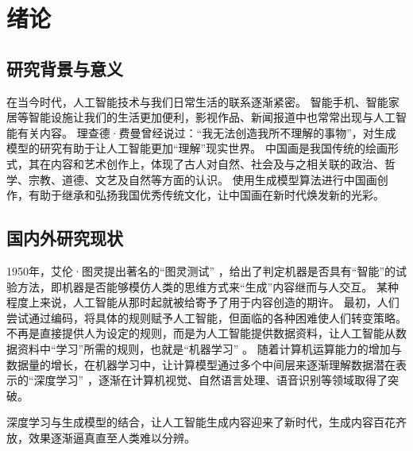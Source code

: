 \chapter{绪论}
\setcounter{page}{1}



\section{研究背景与意义}
在当今时代，人工智能技术与我们日常生活的联系逐渐紧密。
智能手机、智能家居等智能设施让我们的生活更加便利，影视作品、新闻报道中也常常出现与人工智能有关内容。
理查德·费曼曾经说过：“我无法创造我所不理解的事物”，对生成模型的研究有助于让人工智能更加“理解”现实世界。
中国画{\cite{chinesepainting}}是我国传统的绘画形式，其在内容和艺术创作上，体现了古人对自然、社会及与之相关联的政治、哲学、宗教、道德、文艺及自然等方面的认识。
使用生成模型算法进行中国画创作，有助于继承和弘扬我国优秀传统文化，让中国画在新时代焕发新的光彩。









\section{国内外研究现状}
1950年，艾伦·图灵提出著名的“图灵测试” {\cite{machinery1950computing}}，给出了判定机器是否具有“智能”的试验方法，即机器是否能够模仿人类的思维方式来“生成”内容继而与人交互。
某种程度上来说，人工智能从那时起就被给寄予了用于内容创造的期许{\cite{aigcwhitebook}}。
最初，人们尝试通过编码，将具体的规则赋予人工智能，但面临的各种困难使人们转变策略。
不再是直接提供人为设定的规则，而是为人工智能提供数据资料，让人工智能从数据资料中“学习”所需的规则，也就是“机器学习” {\cite{goodfellow2016deep}}。
随着计算机运算能力的增加与数据量的增长，在机器学习中，让计算模型通过多个中间层来逐渐理解数据潜在表示的“深度学习” {\cite{lecun2015deep}}，逐渐在计算机视觉、自然语言处理、语音识别等领域取得了突破。

深度学习与生成模型的结合，让人工智能生成内容迎来了新时代，生成内容百花齐放，效果逐渐逼真直至人类难以分辨。

